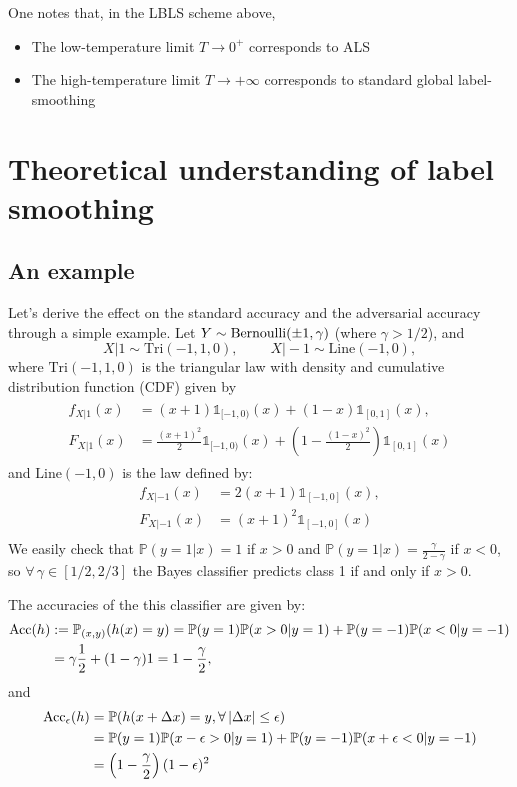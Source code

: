 One notes that, in the LBLS scheme above,
\begin{itemize}
\item The low-temperature limit $T \rightarrow 0^+$ corresponds to ALS
\item The high-temperature limit $T \rightarrow +\infty$ corresponds to standard
  global label-smoothing
\end{itemize}


\section{Theoretical understanding of label smoothing}
\subsection{An example}
\label{sec:overlap_example}

Let's derive the effect on the standard accuracy and the adversarial accuracy
through a simple example.
Let $Y \sim \operatorname{Bernoulli}(\pm 1, \gamma)$ (where $\gamma > 1/2$), and
$$ X|1 \sim \text{Tri}(-1,1,0),\; \quad \quad X|-1 \sim \text{Line}(-1,0),$$
where $\text{Tri}(-1,1,0)$ is the triangular law with density
and cumulative distribution function (CDF) given by
\begin{eqnarray*}
  \begin{split}
    f_{X|1}(x) &= (x+1)\mathbb{1}_{[-1,0)}(x) + (1-x)\mathbb{1}_{[0,1]}(x), \\
    F_{X|1}(x) &= \frac{(x+1)^2}{2}\mathbb{1}_{[-1,0)}(x) + \left(1 -
    \frac{(1-x)^2}{2}\right)\mathbb{1}_{[0,1]}(x)
 \end{split}
\end{eqnarray*} 
and $\text{Line}(-1,0)$ is the law defined by:
\begin{align*}
f_{X|-1}(x) &= 2(x+1)\mathbb{1}_{[-1,0]}(x),\\
F_{X|-1}(x) &= (x+1)^2\mathbb{1}_{[-1,0]}(x) \\
\end{align*}
We easily check that $\mathbb{P}(y = 1 | x) = 1$ if $x > 0$ and
$\displaystyle{\mathbb{P}(y = 1 | x) = \frac{\gamma}{2-\gamma}}$ if $x < 0$, so
$\forall \, \gamma \in [1/2 , 2/3]$ the Bayes classifier predicts class 1 if and
only if $x > 0$.

The accuracies of the this classifier are given by:
\begin{align*}
  \operatorname{Acc}(h) &:= \mathbb{P}_{(x,y)}(h(x)=y) =\mathbb{P}(y=1)\mathbb{P}(x>0|y=1) + \mathbb{P}(y=-1)\mathbb{P}(x<0|y=-1) \\ &= \gamma \frac{1}{2} + (1-\gamma)1 = 1 - \frac{\gamma}{2},
\end{align*}
and
\begin{align*}
\operatorname{Acc}_\epsilon(h) &= \mathbb{P}(h(x+ \Delta x) = y, \forall \, |\Delta x| \leq \epsilon) \\
&= \mathbb{P}(y=1)\mathbb{P}(x - \epsilon > 0 | y=1) + \mathbb{P}(y=-1)\mathbb{P}(x + \epsilon < 0 | y=-1) \\
&= \left( 1 - \frac{\gamma}{2} \right) (1- \epsilon)^2
\end{align*}


